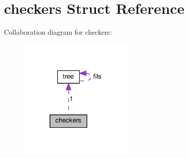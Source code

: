 \hypertarget{structcheckers}{}\section{checkers Struct Reference}
\label{structcheckers}


Collaboration diagram for checkers\+:\nopagebreak
\begin{figure}[H]
\begin{center}
\leavevmode
\includegraphics[width=159pt]{structcheckers__coll__graph}
\end{center}
\end{figure}
